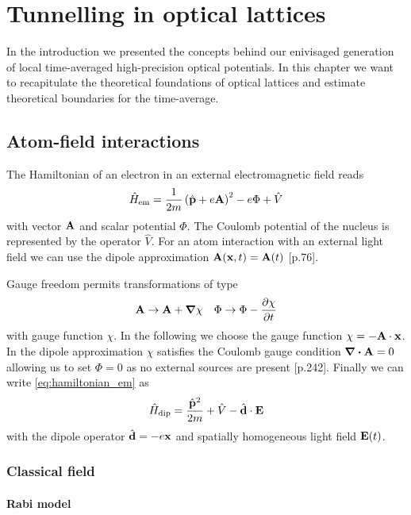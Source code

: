 \chapter{Tunnelling in optical lattices}

In the introduction we presented the concepts behind our enivisaged
generation of local time-averaged high-precision optical potentials. In this
chapter we want to recapitulate the theoretical foundations of optical
lattices and estimate theoretical boundaries for the time-average.

\section{Atom-field interactions}

The Hamiltonian of an electron in an external electromagnetic field reads
\begin{equation}
  \hat{H}_\text{em}
  =\frac{1}{2m}\left(\hat{\vb{p}}+e\vb{A}\right)^2-e\Phi+\hat{V}
  \label{eq:hamiltonian_em}
\end{equation}
with vector $\vb{A}$ and scalar potential $\Phi$. The Coulomb potential of
the nucleus is represented by the operator $\hat{V}$. For an atom interaction
with an external light field we can use the dipole approximation
$\vb{A}(\vb{x},t)=\vb{A}(t)$ \cite{Gerry2004}[p.76].

Gauge freedom permits transformations of type
\begin{align}
  \vb{A}\to\vb{A}+\grad{\chi}
  &&
  \Phi\to\Phi-\pdv{\chi}{t}
\end{align}
with gauge function $\chi$. In the following we choose the gauge function
$\chi=-\vb{A}\cdot\vb{x}$. In the dipole approximation $\chi$ satisfies the
Coulomb gauge condition $\divergence{\vb{A}}=0$ allowing us to set $\Phi=0$
as no external sources are present \cite{Jackson2005}[p.242]. Finally we can
write \cref{eq:hamiltonian_em} as
\begin{equation}
  \hat{H}_\text{dip}
  =\frac{\hat{\vb{p}}^2}{2m}+\hat{V}-\hat{\vb{d}}\cdot\vb{E}
  \label{eq:hamiltonian_dip}
\end{equation}
with the dipole operator $\hat{\vb{d}}=-e\vb{x}$ and spatially homogeneous
light field $\vb{E}(t)$.

\subsection{Classical field}


\subsubsection{Rabi model}
